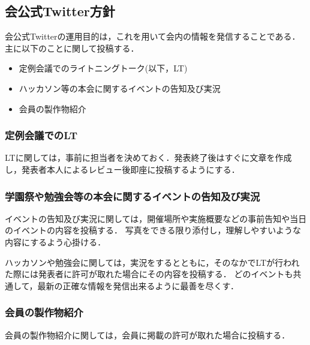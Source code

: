 \subsection*{会公式Twitter方針}


会公式Twitterの運用目的は，これを用いて会内の情報を発信することである．主に以下のことに関して投稿する．
\begin{itemize}
\item 定例会議でのライトニングトーク(以下，LT)
\item ハッカソン等の本会に関するイベントの告知及び実況
\item 会員の製作物紹介
\end{itemize}

\subsubsection*{定例会議でのLT}
LTに関しては，事前に担当者を決めておく．発表終了後はすぐに文章を作成し，発表者本人によるレビュー後即座に投稿するようにする．

\subsubsection*{学園祭や勉強会等の本会に関するイベントの告知及び実況}
イベントの告知及び実況に関しては，開催場所や実施概要などの事前告知や当日のイベントの内容を投稿する．
写真をできる限り添付し，理解しやすいような内容にするよう心掛ける．

ハッカソンや勉強会に関しては，実況をするとともに，そのなかでLTが行われた際には発表者に許可が取れた場合にその内容を投稿する．
どのイベントも共通して，最新の正確な情報を発信出来るように最善を尽くす．

\subsubsection*{会員の製作物紹介}
会員の製作物紹介に関しては，会員に掲載の許可が取れた場合に投稿する．

